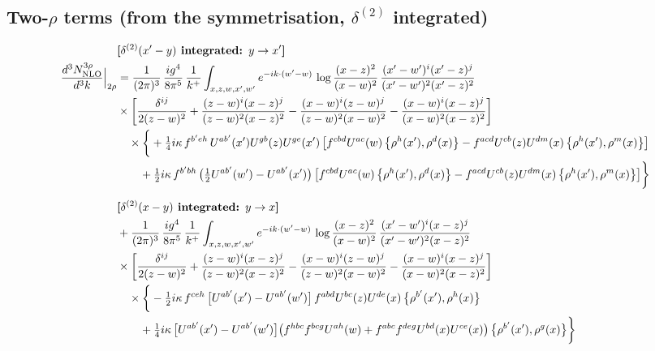 \documentclass[10pt]{article}
\numberwithin{equation}{section}
\begin{document}
\subsection{Two-$\rho$ terms (from the symmetrisation, $\delta^{(2)}$ integrated)}
\begin{align}
&\textbf{[$\delta^{(2)}(x^{\prime}-y)$ integrated: $y\to x^{\prime}$]}\notag\\
\frac{d^{3}N^{3\rho}_{\rm NLO}}{d^{3}k}\Big|_{2\rho}&=\frac{1}{(2\pi)^{3}}\,\frac{ig^{4}}{8\pi^{5}}\,\frac{1}{k^{+}}\int_{x,z,w,x^{\prime},w^{\prime}}e^{-ik\cdot(w^{\prime}-w)}\,\log\frac{(x-z)^{2}}{(x-w)^{2}}\,\frac{(x^{\prime}-w^{\prime})^{i}(x^{\prime}-z)^{j}}{(x^{\prime}-w^{\prime})^{2}(x^{\prime}-z)^{2}}\notag\\
&\times\bigg[\frac{\delta^{ij}}{2(z-w)^{2}}+\frac{(z-w)^{i}(x-z)^{j}}{(z-w)^{2}(x-z)^{2}}-\frac{(x-w)^{i}(z-w)^{j}}{(z-w)^{2}(x-w)^{2}}-\frac{(x-w)^{i}(x-z)^{j}}{(x-w)^{2}(x-z)^{2}}\bigg]\notag\\
&\quad\times\bigg\{+\tfrac14 i\kappa\,f^{b^{\prime}eh}\,U^{ab^{\prime}}(x^{\prime})U^{gb}(z)U^{ge}(x^{\prime})\,\big[f^{cbd}U^{ac}(w)\,\big\{\rho^{h}(x^{\prime}),\rho^{d}(x)\big\}-f^{acd}U^{cb}(z)U^{dm}(x)\,\big\{\rho^{h}(x^{\prime}),\rho^{m}(x)\big\}\big]\notag\\&\qquad+\tfrac12 i\kappa\,f^{b^{\prime}bh}\,\big(\tfrac12U^{ab^{\prime}}(w^{\prime})-U^{ab^{\prime}}(x^{\prime})\big)\,\big[f^{cbd}U^{ac}(w)\,\big\{\rho^{h}(x^{\prime}),\rho^{d}(x)\big\}-f^{acd}U^{cb}(z)U^{dm}(x)\,\big\{\rho^{h}(x^{\prime}),\rho^{m}(x)\big\}\big]\bigg\}\notag\\[6pt]
&\textbf{[$\delta^{(2)}(x-y)$ integrated: $y\to x$]}\notag\\
&+\frac{1}{(2\pi)^{3}}\,\frac{ig^{4}}{8\pi^{5}}\,\frac{1}{k^{+}}\int_{x,z,w,x^{\prime},w^{\prime}}e^{-ik\cdot(w^{\prime}-w)}\,\log\frac{(x-z)^{2}}{(x-w)^{2}}\,\frac{(x^{\prime}-w^{\prime})^{i}(x-z)^{j}}{(x^{\prime}-w^{\prime})^{2}(x-z)^{2}}\notag\\
&\times\bigg[\frac{\delta^{ij}}{2(z-w)^{2}}+\frac{(z-w)^{i}(x-z)^{j}}{(z-w)^{2}(x-z)^{2}}-\frac{(x-w)^{i}(z-w)^{j}}{(z-w)^{2}(x-w)^{2}}-\frac{(x-w)^{i}(x-z)^{j}}{(x-w)^{2}(x-z)^{2}}\bigg]\notag\\
&\quad\times\bigg\{-\tfrac12 i\kappa\,f^{ceh}\,\big[U^{ab^{\prime}}(x^{\prime})-U^{ab^{\prime}}(w^{\prime})\big]\,f^{abd}U^{bc}(z)U^{de}(x)\,\big\{\rho^{b^{\prime}}(x^{\prime}),\rho^{h}(x)\big\}\notag\\&\qquad+\tfrac14 i\kappa\,\big[U^{ab^{\prime}}(x^{\prime})-U^{ab^{\prime}}(w^{\prime})\big]\big(f^{hbc}f^{bcg}U^{ah}(w)+f^{abc}f^{deg}U^{bd}(x)U^{ce}(x)\big)\,\big\{\rho^{b^{\prime}}(x^{\prime}),\rho^{g}(x)\big\}\bigg\}\notag\\[6pt]

\end{align}
\end{document}
